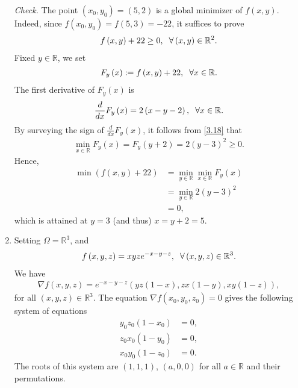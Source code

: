 \documentclass[a4paper]{article}
\numberwithin{equation}{section}
\begin{document}
\begin{enumerate}
\textit{Check.} The point $\left(x_0,y_0\right)=\left(5,2\right)$ is a global minimizer of $f\left(x,y\right)$. Indeed, since $f\left(x_0, y_0\right)=f\left(5,3\right)=-22$, it suffices to prove
\begin{align}
f\left( {x,y} \right) + 22 \ge 0,\hspace{0.2cm}\forall \left( {x,y} \right) \in {\mathbb{R}^2}.
\end{align}
Fixed $y\in \mathbb{R}$, we set
\begin{align}
{F_y}\left( x \right): = f\left( {x,y} \right) + 22 ,\hspace{0.2cm}\forall x \in \mathbb{R}.
\end{align}
The first derivative of $F_y\left(x\right)$ is 
\begin{align}
\label{3.18}
\frac{d}{{dx}}{F_y}\left( x \right) = 2\left( {x - y - 2} \right),\hspace{0.2cm}\forall x \in \mathbb{R}.
\end{align}
By surveying the sign of $\frac{d}{{dx}}{F_y}\left( x \right)$, it follows from \eqref{3.18} that
\begin{align}
\mathop {\min }\limits_{x \in \mathbb{R}} {F_y}\left( x \right) = {F_y}\left( {y + 2} \right) = 2{\left( {y - 3} \right)^2}\ge 0.
\end{align}
Hence, 
\begin{align}
\min \left( {f\left( {x,y} \right) + 22} \right) &= \mathop {\min }\limits_{y \in \mathbb{R}} \mathop {\min }\limits_{x \in \mathbb{R}} {F_y}\left( x \right)\\
& = \mathop {\min }\limits_{y \in \mathbb{R}} 2{\left( {y - 3} \right)^2}\\
& = 0,
\end{align}
which is attained at $y=3$ (and thus) $x=y+2=5$.
\item Setting $\Omega =\mathbb{R}^3$, and
\begin{align}
f\left( {x,y,z} \right) = xyz{e^{ - x - y - z}},\hspace{0.2cm}\forall \left( {x,y,z} \right) \in {\mathbb{R}^3}.
\end{align}
We have
\begin{align}
\nabla f\left( {x,y,z} \right) = {e^{ - x - y - z}}\left( {yz\left( {1 - x} \right),zx\left( {1 - y} \right),xy\left( {1 - z} \right)} \right),
\end{align}
for all $\left( {x,y,z} \right) \in {\mathbb{R}^3}$. The equation $\nabla f\left( {{x_0},{y_0},{z_0}} \right) = 0$ gives the following system of equations
\begin{align}
{y_0}{z_0}\left( {1 - {x_0}} \right) &= 0,\\
{z_0}{x_0}\left( {1 - {y_0}} \right) &= 0,\\
{x_0}{y_0}\left( {1 - {z_0}} \right) &= 0.
\end{align}
The roots of this system are $\left(1,1,1\right)$, $\left(a,0,0\right)$ for all $a\in \mathbb{R}$ and their permutations. 


\end{enumerate}
\end{document}
